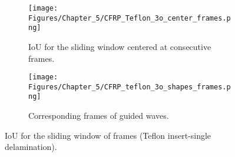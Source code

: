 \begin{figure} [!h]
	\begin{subfigure}[b]{1\textwidth}
		\centering
		\texttt{[image: Figures/Chapter\_5/CFRP\_Teflon\_3o\_center\_frames.png]}
		\caption{IoU for the sliding window centered at consecutive frames.}
		\label{fig:CFRP_Teflon_3o_center_frames}
	\end{subfigure}
	\begin{subfigure}[b]{1\textwidth}
		\centering
		\texttt{[image: Figures/Chapter\_5/CFRP\_teflon\_3o\_shapes\_frames.png]}
		\caption{Corresponding frames of guided waves.} 
		\label{fig:CFRP_teflon_3o_preds_frames}
	\end{subfigure}
	\caption{IoU for the sliding window of frames (Teflon insert-single delamination).}
	\label{fig:CFRP_Teflon_3o_IoU_centre_window}
\end{figure} 

